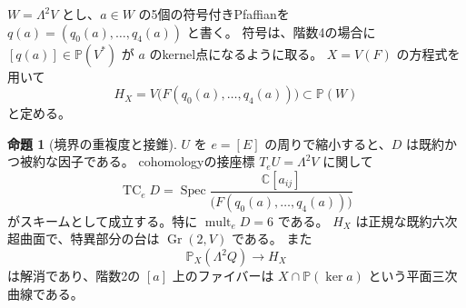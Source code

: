 \documentclass[a4paper,11pt]{ltjsarticle}
\theoremstyle{definition}
\newtheorem{theorem}{命題}[section]
\newcommand{\CC}{\mathbb C}
\newcommand{\PP}{\mathbb P}
\newcommand{\Gr}{\operatorname{Gr}}
\begin{document}
$W=\Lambda^2V$ とし、$a\in W$ の5個の符号付きPfaffianを
$q(a)=(q_0(a),\ldots,q_4(a))$ と書く。
符号は、階数4の場合に $[q(a)]\in\PP(V^*)$ が $a$ のkernel点になるように取る。
$X=V(F)$ の方程式を用いて
\[
 H_X=V\bigl(F(q_0(a),\ldots,q_4(a))\bigr)\subset\PP(W)
\]
と定める。

\begin{theorem}[境界の重複度と接錐]\label{thm:sextic-boundary}
$U$ を $e=[E]$ の周りで縮小すると、$D$ は既約かつ被約な因子である。
cohomologyの接座標 $T_eU=\Lambda^2V$ に関して
\[
 \operatorname{TC}_eD
 =\operatorname{Spec}
 \frac{\CC[a_{ij}]}{\bigl(F(q_0(a),\ldots,q_4(a))\bigr)}
\]
がスキームとして成立する。特に $\operatorname{mult}_eD=6$ である。
$H_X$ は正規な既約六次超曲面で、特異部分の台は $\Gr(2,V)$ である。
また
\[
 \PP_X(\Lambda^2Q)\longrightarrow H_X
\]
は解消であり、階数2の $[a]$ 上のファイバーは
$X\cap\PP(\ker a)$ という平面三次曲線である。
\end{theorem}
\end{document}
